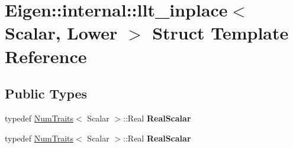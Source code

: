 \hypertarget{struct_eigen_1_1internal_1_1llt__inplace_3_01_scalar_00_01_lower_01_4}{}\section{Eigen\+:\+:internal\+:\+:llt\+\_\+inplace$<$ Scalar, Lower $>$ Struct Template Reference}
\label{struct_eigen_1_1internal_1_1llt__inplace_3_01_scalar_00_01_lower_01_4}
\subsection*{Public Types}
\begin{DoxyCompactItemize}
\item 
\mbox{\label{struct_eigen_1_1internal_1_1llt__inplace_3_01_scalar_00_01_lower_01_4_a740535ced836b91d158c77b72223324d}} 
typedef \hyperlink{group___core___module_struct_eigen_1_1_num_traits}{Num\+Traits}$<$ Scalar $>$\+::Real {\bfseries Real\+Scalar}
\item 
\mbox{\label{struct_eigen_1_1internal_1_1llt__inplace_3_01_scalar_00_01_lower_01_4_a740535ced836b91d158c77b72223324d}} 
typedef \hyperlink{group___core___module_struct_eigen_1_1_num_traits}{Num\+Traits}$<$ Scalar $>$\+::Real {\bfseries Real\+Scalar}
\end{DoxyCompactItemize}

